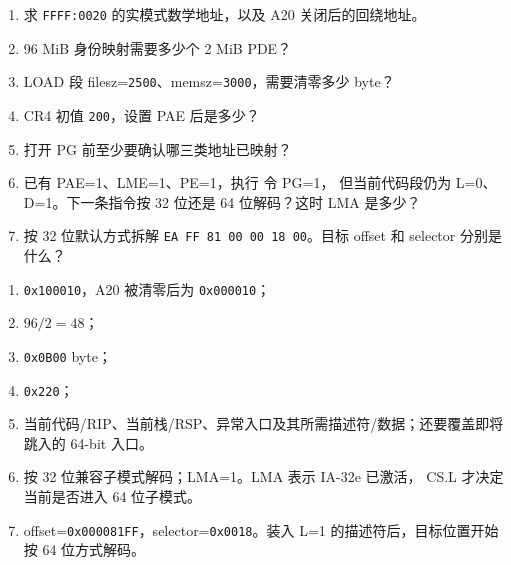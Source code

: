 \begin{enumerate}[leftmargin=2.2em]
  \item 求 \texttt{FFFF:0020} 的实模式数学地址，以及 A20 关闭后的回绕地址。
  \item 96 MiB 身份映射需要多少个 2 MiB PDE？
  \item LOAD 段 filesz=\texttt{2500}、memsz=\texttt{3000}，需要清零多少
    byte？
  \item CR4 初值 \texttt{200}，设置 PAE 后是多少？
  \item 打开 PG 前至少要确认哪三类地址已映射？
  \item 已有 PAE=1、LME=1、PE=1，执行  令 PG=1，
    但当前代码段仍为 L=0、D=1。下一条指令按 32 位还是 64 位解码？这时
    LMA 是多少？
  \item 按 32 位默认方式拆解
    \texttt{EA FF 81 00 00 18 00}。目标 offset 和 selector 分别是什么？
\end{enumerate}

\begin{answerbox}
\begin{enumerate}[leftmargin=2.2em]
  \item \texttt{0x100010}，A20 被清零后为 \texttt{0x000010}；
  \item \(96/2=48\)；
  \item \texttt{0x0B00} byte；
  \item \texttt{0x220}；
  \item 当前代码/RIP、当前栈/RSP、异常入口及其所需描述符/数据；还要覆盖即将
    跳入的 64-bit 入口。
  \item 按 32 位兼容子模式解码；LMA=1。LMA 表示 IA-32e 已激活，
    CS.L 才决定当前是否进入 64 位子模式。
  \item offset=\texttt{0x000081FF}，selector=\texttt{0x0018}。装入
    L=1 的描述符后，目标位置开始按 64 位方式解码。
\end{enumerate}
\end{answerbox}
